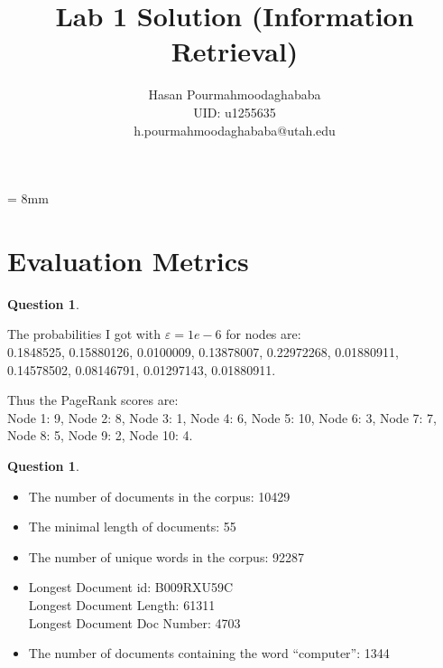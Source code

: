 \documentclass[11pt,a4paper,reqno]{amsart}
\theoremstyle{definition}
\theoremstyle{notation}
\newtheorem{question}[theorem]{Question}
\begin{document}
\title[Lab 1 Solution (Information Retrieval)]
{Lab 1 Solution (Information Retrieval)}


\author[Hasan Pourmahmoodaghababa]{Hasan Pourmahmoodaghababa \\ UID: u1255635 \\ h.pourmahmoodaghababa@utah.edu}
    \address{School of Computing, University of Utah, Utah, USA}


\maketitle

\baselineskip = 8mm


\section{Evaluation Metrics}

\begin{question}%
\end{question}
The probabilities I got with $\varepsilon=1e-6$ for nodes are: \\
0.1848525, 0.15880126, 0.0100009, 0.13878007, 0.22972268, 0.01880911, 0.14578502, 0.08146791, 0.01297143, 0.01880911.

Thus the PageRank scores are: \\ %
Node 1: 9, 
Node 2: 8,
Node 3: 1,
Node 4: 6,
Node 5: 10,
Node 6: 3,
Node 7: 7,
Node 8: 5, 
Node 9: 2,
Node 10: 4.

\begin{question}%
\end{question}
\begin{itemize}
\item
The number of documents in the corpus: 10429
\item
The minimal length of documents: 55
\item
The number of unique words in the corpus: 92287
\item
Longest Document id: B009RXU59C \\
Longest Document Length: 61311 \\
Longest Document Doc Number: 4703
\item
The number of documents containing the word ``computer'': 1344 
\end{itemize}
\end{document}
